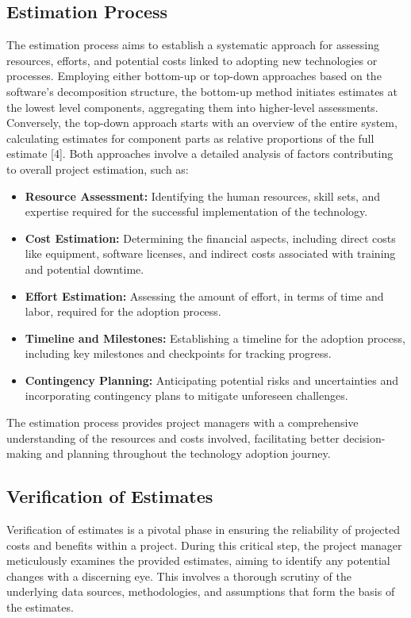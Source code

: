 \documentclass{article}
\begin{document}
\subsection{Estimation Process}
The estimation process aims to establish a systematic approach for assessing resources, efforts, and potential costs linked to adopting new technologies or processes. Employing either bottom-up or top-down approaches based on the software's decomposition structure, the bottom-up method initiates estimates at the lowest level components, aggregating them into higher-level assessments. Conversely, the top-down approach starts with an overview of the entire system, calculating estimates for component parts as relative proportions of the full estimate [4]. Both approaches involve a detailed analysis of factors contributing to overall project estimation, such as:
\begin{itemize}
    \item \textbf{Resource Assessment:} Identifying the human resources, skill sets, and expertise required for the successful implementation of the technology.
    \item \textbf{Cost Estimation:} Determining the financial aspects, including direct costs like equipment, software licenses, and indirect costs associated with training and potential downtime.
    \item \textbf{Effort Estimation:} Assessing the amount of effort, in terms of time and labor, required for the adoption process.
    \item \textbf{Timeline and Milestones:} Establishing a timeline for the adoption process, including key milestones and checkpoints for tracking progress.
    \item \textbf{Contingency Planning:} Anticipating potential risks and uncertainties and incorporating contingency plans to mitigate unforeseen challenges.
\end{itemize}

\noindent The estimation process provides project managers with a comprehensive understanding of the resources and costs involved, facilitating better decision-making and planning throughout the technology adoption journey.


\subsection{Verification of Estimates}
Verification of estimates is a pivotal phase in ensuring the reliability of projected costs and benefits within a project. During this critical step, the project manager meticulously examines the provided estimates, aiming to identify any potential changes with a discerning eye. This involves a thorough scrutiny of the underlying data sources, methodologies, and assumptions that form the basis of the estimates.\newline
\end{document}
